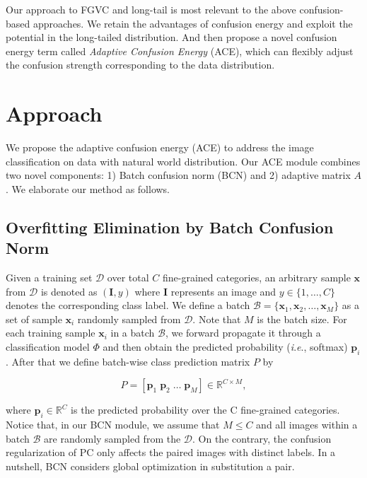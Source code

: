 \documentclass{article}
\newcommand{\bp}{{\mathbf{p}}}
\newcommand{\bx}{{\mathbf{x}}}
\newcommand{\bI}{{\mathbf{I}}}
\newcommand{\bbR}{{\mathbb{R}}}
\newcommand{\cB}{{\mathcal{B}}}
\newcommand{\cD}{{\mathcal{D}}}
\newcommand{\ie}{\textit{i}.\textit{e}.}
\begin{document}
Our approach to FGVC and long-tail is most relevant to the above confusion-based approaches. We retain the advantages of confusion energy and exploit the potential in the long-tailed distribution. And then propose a novel confusion energy term called {\em Adaptive Confusion Energy} (ACE), which can flexibly adjust the confusion strength corresponding to the data distribution.

\section{Approach}
\label{sec:approach}


We propose the adaptive confusion energy (ACE) to address the image classification on data with natural world distribution. Our ACE module combines two novel components: 1) Batch confusion norm (BCN) and 2) adaptive matrix $A$. We elaborate our method as follows. 


\subsection{Overfitting Elimination by Batch Confusion Norm}
\label{sec:BCN}

Given a training set $\cD$ over total $C$ fine-grained categories, an arbitrary sample $\bx$ from $\cD$ is denoted as $(\bI, y)$ where $\bI$ represents an image and $y \in \{1, \dots, C\}$ denotes the corresponding class label. We define a batch $\cB = \{\bx_1, \bx_2, \dots, \bx_M\}$ as a set of sample $\bx_i$ randomly sampled from $\cD$. Note that $M$ is the batch size. For each training sample $\bx_i$ in a batch $\cB$, we forward propagate it through a classification model $\Phi$ and then obtain the predicted probability (\ie, softmax) $\bp_i$. After that we define batch-wise class prediction matrix $P$ by 
\begin{linenomath}
\begin{equation}
    P = \left[\bp_1 \; \bp_2\; \dots\; \bp_M \right] \in \bbR^{C\times M},
\end{equation}
\end{linenomath}
where $\bp_i \in \bbR^{C}$ is the predicted probability over the C fine-grained categories. Notice that, in our BCN module, we assume that $M \le C$ and all images within a batch $\cB$ are randomly sampled from the $\cD$. On the contrary, the confusion regularization of PC \cite{dubey2018pairwise} only affects the paired images with distinct labels. In a nutshell, BCN considers global optimization in substitution a pair.  
\end{document}

